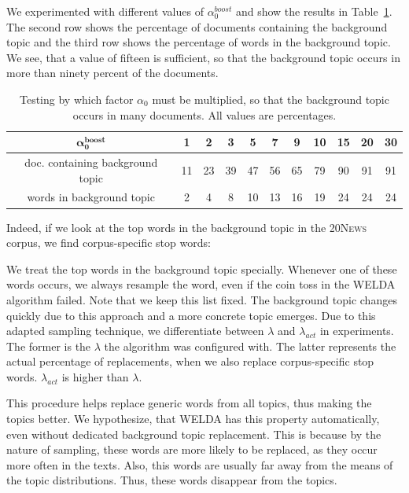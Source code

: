 \documentclass[
        a4paper,
        titlepage,
        twoside,
        parskip
        ]{scrbook}
\newcommand{\ra}[1]{\renewcommand{\arraystretch}{#1}}
\theoremstyle{break}
\begin{document}
We experimented with different values of $\alpha_0^{boost}$ and show the results in Table~\ref{table:alpha0_boost}.
The second row shows the percentage of documents containing the background topic and the third row shows the percentage of words in the background topic.
We see, that a value of fifteen is sufficient, so that the background topic occurs in more than ninety percent of the documents.
\begin{table}[]
  \ra{1.2}
  \centering
  \caption{Testing by which factor $\alpha_0$ must be multiplied, so that the background topic occurs in many documents.
  All values are percentages.}
  \label{table:alpha0_boost}
  \begin{tabular}{ccccccccccc}
    \toprule
    $\boldsymbol{\alpha_0^{boost}}$                & \textbf{1}     & \textbf{2}     & \textbf{3}     & \textbf{5}     & \textbf{7}     & \textbf{9}     & \textbf{10}    & \textbf{15}    & \textbf{20}    & \textbf{30}    \\
    \midrule
  doc. containing background topic  & 11  & 23  & 39  & 47  & 56  & 65  & 79  & 90  & 91  & 91  \\
  words in background topic & 2   & 4   & 8   & 10  & 13  & 16  & 19  & 24  & 24  & 24 \\
    \bottomrule
  \end{tabular}
\end{table}
Indeed, if we look at the top words in the background topic in the \textsc{20News} corpus, we find corpus-specific stop words: \\
\noindent{}

We treat the top words in the background topic specially.
Whenever one of these words occurs, we always resample the word, even if the coin toss in the WELDA algorithm failed.
Note that we keep this list fixed.
The background topic changes quickly due to this approach and a more concrete topic emerges.
Due to this adapted sampling technique, we differentiate between $\lambda$ and $\lambda_{act}$ in experiments.
The former is the $\lambda$ the algorithm was configured with.
The latter represents the actual percentage of replacements, when we also replace corpus-specific stop words.
$\lambda_{act}$ is higher than $\lambda$.

This procedure helps replace generic words from all topics, thus making the topics better.
We hypothesize, that WELDA has this property automatically, even without dedicated background topic replacement.
This is because by the nature of sampling, these words are more likely to be replaced, as they occur more often in the texts.
Also, this words are usually far away from the means of the topic distributions.
Thus, these words disappear from the topics.
\end{document}

